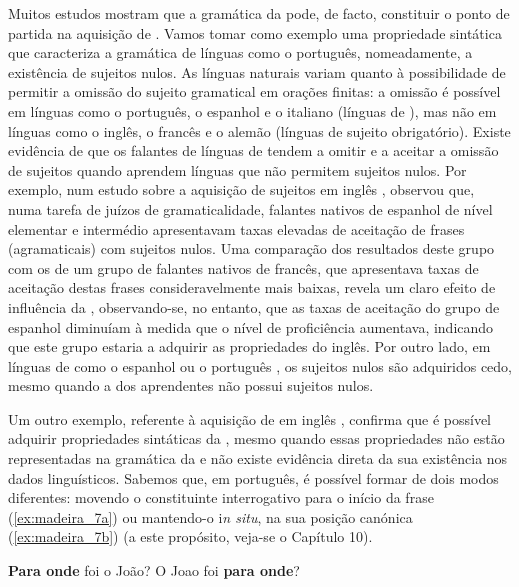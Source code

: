 \documentclass[output=paper]{LSP/langsci}
\begin{document}
Muitos estudos mostram que a gramática da  pode, de facto, constituir o ponto de partida na aquisição de . Vamos tomar como exemplo uma propriedade sintática que caracteriza a gramática de línguas como o português, nomeadamente, a existência de sujeitos nulos. As línguas naturais variam quanto à possibilidade de permitir a omissão do sujeito gramatical em orações finitas: a omissão é possível em línguas como o português, o espanhol e o italiano (línguas de ), mas não em línguas como o inglês, o francês e o alemão (línguas de sujeito obrigatório). Existe evidência de que os falantes de línguas de  tendem a omitir e a aceitar a omissão de sujeitos quando aprendem línguas que não permitem sujeitos nulos. Por exemplo, num estudo sobre a aquisição de sujeitos em inglês , \citet{white1985pro} observou que, numa tarefa de juízos de gramaticalidade, falantes nativos de espanhol de nível elementar e intermédio apresentavam taxas elevadas de aceitação de frases (agramaticais) com sujeitos nulos. Uma comparação dos resultados deste grupo com os de um grupo de falantes nativos de francês, que apresentava taxas de aceitação destas frases consideravelmente mais baixas, revela um claro efeito de influência da , observando-se, no entanto, que as taxas de aceitação do grupo de espanhol  diminuíam à medida que o nível de proficiência aumentava, indicando que este grupo estaria a adquirir as propriedades do inglês. Por outro lado, em línguas de  como o espanhol \citep{montrulrodriguez2006} ou o português \citep{madeira_etal2009}, os sujeitos nulos são adquiridos cedo, mesmo quando a  dos aprendentes não possui sujeitos nulos.

Um outro exemplo, referente à aquisição de  em inglês , confirma que é possível adquirir propriedades sintáticas da , mesmo quando essas propriedades não estão representadas na gramática da  e não existe evidência direta da sua existência nos dados linguísticos. Sabemos que, em português, é possível formar  de dois modos diferentes: movendo o constituinte interrogativo para o início da frase (\ref{ex:madeira_7a}) ou mantendo-o i\textit{n situ}, na sua posição canónica (\ref{ex:madeira_7b}) (a este propósito, veja-se o Capítulo 10). 

\ea\label{ex:madeira_7}
\ea\label{ex:madeira_7a} \textbf{Para onde} foi o João?
\ex\label{ex:madeira_7b} O Joao foi \textbf{para onde}?
\zl
\end{document}
